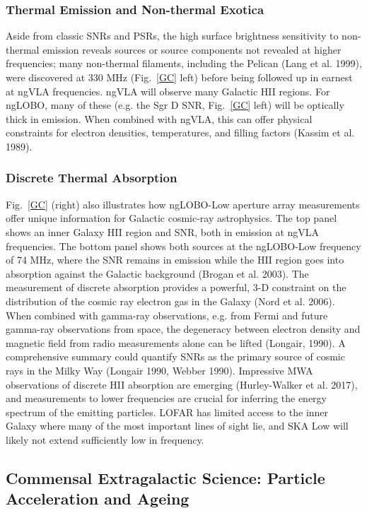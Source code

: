 \documentclass[11pt]{article}
\begin{document}
\subsubsection{Thermal Emission and Non-thermal Exotica}

Aside from classic SNRs and PSRs, the high surface brightness sensitivity to non-thermal emission reveals sources or source components not revealed at higher frequencies; many non-thermal filaments, including the Pelican (Lang et al. 1999), were discovered at 330 MHz (Fig.~\ref{GC} left) before being followed up in earnest at ngVLA frequencies. ngVLA will observe many Galactic HII regions. For ngLOBO, many of these (e.g. the Sgr D SNR, Fig.~\ref{GC} left) will be optically thick in emission. When combined with ngVLA, this can offer physical constraints for electron densities, temperatures, and filling factors (Kassim et al. 1989). 

\subsubsection{Discrete Thermal Absorption}

Fig.~\ref{GC} (right) also illustrates how ngLOBO-Low aperture array measurements offer unique information for Galactic cosmic-ray astrophysics. The top panel shows an inner Galaxy HII region and SNR, both in emission at ngVLA frequencies. The bottom panel shows both sources at the ngLOBO-Low frequency of 74 MHz, where the SNR remains in emission while the HII region goes into absorption against the Galactic background (Brogan et al. 2003). The measurement of discrete absorption provides a powerful, 3-D constraint on the distribution of the cosmic ray electron gas in the Galaxy (Nord et al. 2006). When combined with gamma-ray observations, e.g. from Fermi and future gamma-ray observations from space, the degeneracy between electron density and magnetic field from radio measurements alone can be lifted (Longair, 1990).  A comprehensive summary could quantify SNRs as the primary source of cosmic rays in the Milky Way (Longair 1990, Webber 1990). Impressive MWA observations of discrete HII absorption are emerging (Hurley-Walker et al. 2017), and measurements to lower frequencies are crucial for inferring the energy spectrum of the emitting particles. LOFAR has limited access to the inner Galaxy where many of the most important lines of sight lie, and SKA Low will likely not extend sufficiently low in frequency.


\subsection{Commensal Extragalactic Science: Particle Acceleration and Ageing}
\end{document}

